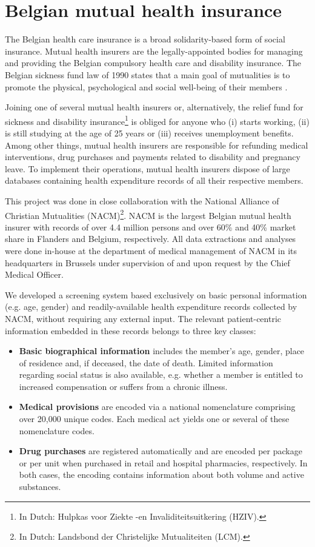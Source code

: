 \section{Belgian mutual health insurance} \label{intro:health-insurance}
The Belgian health care insurance is a broad solidarity-based form of social insurance. Mutual health insurers are the legally-appointed bodies for managing and providing the Belgian compulsory health care and disability insurance. The Belgian sickness fund law of 1990 states that a main goal of mutualities is to promote the physical, psychological and social well-being of their members \citep{ziekenfondswet}.

Joining one of several mutual health insurers or, alternatively, the relief fund for sickness and disability insurance\footnote{In Dutch: Hulpkas voor Ziekte -en Invaliditeitsuitkering (HZIV).} is obliged for anyone who (i) starts working, (ii) is still studying at the age of 25 years or (iii) receives unemployment benefits. Among other things, mutual health insurers are responsible for refunding medical interventions, drug purchases and payments related to disability and pregnancy leave. To implement their operations, mutual health insurers dispose of large databases containing health expenditure records of all their respective members. 

This project was done in close collaboration with the National Alliance of Christian Mutualities (NACM)\footnote{In Dutch: Landsbond der Christelijke Mutualiteiten (LCM).}. NACM  is the largest Belgian mutual health insurer with records of over 4.4 million persons and over 60\% and 40\% market share in Flanders and Belgium, respectively. All data extractions and analyses were done in-house at the department of medical management of NACM in its headquarters in Brussels under supervision of and upon request by the Chief Medical Officer.

We developed a screening system based exclusively on basic personal information (e.g. age, gender) and readily-available health expenditure records collected by NACM, without requiring any external input. The relevant patient-centric information embedded in these records belongs to three key classes:
\begin{itemize}
\item \textbf{Basic biographical information} includes the member's age, gender, place of residence and, if deceased, the date of death. Limited information regarding social status is also available, e.g. whether a member is entitled to increased compensation or suffers from a chronic illness.
\item \textbf{Medical provisions} are encoded via a national nomenclature comprising over 20,000 unique codes. Each medical act yields one or several of these nomenclature codes. 
\item \textbf{Drug purchases} are registered automatically and are encoded per package or per unit when purchased in retail and hospital pharmacies, respectively. In both cases, the encoding contains information about both volume and active substances. 
\end{itemize}


